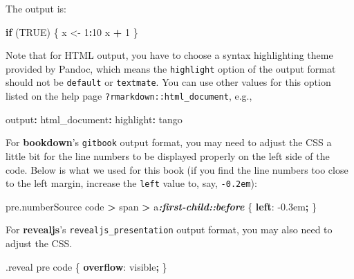 \documentclass[
  11pt,
]{krantz}
\newenvironment{Shaded}{\begin{snugshade}}{\end{snugshade}}
\newcommand{\AttributeTok}[1]{\textcolor[rgb]{0.61,0.61,0.61}{#1}}
\newcommand{\ControlFlowTok}[1]{\textcolor[rgb]{0.27,0.27,0.27}{\textbf{#1}}}
\newcommand{\DataTypeTok}[1]{\textcolor[rgb]{0.27,0.27,0.27}{#1}}
\newcommand{\DecValTok}[1]{\textcolor[rgb]{0.06,0.06,0.06}{#1}}
\newcommand{\FunctionTok}[1]{\textcolor[rgb]{0,0,0}{#1}}
\newcommand{\InformationTok}[1]{\textcolor[rgb]{0.37,0.37,0.37}{\textbf{\textit{#1}}}}
\newcommand{\KeywordTok}[1]{\textcolor[rgb]{0.27,0.27,0.27}{\textbf{#1}}}
\newcommand{\NormalTok}[1]{#1}
\newcommand{\OperatorTok}[1]{\textcolor[rgb]{0.43,0.43,0.43}{\textbf{#1}}}
\newcommand{\OtherTok}[1]{\textcolor[rgb]{0.37,0.37,0.37}{#1}}
\newcommand{\StringTok}[1]{\textcolor[rgb]{0.5,0.5,0.5}{#1}}
\begin{document}
The output is:

\begin{Shaded}
\begin{Highlighting}[numbers=left,,]
\ControlFlowTok{if}\NormalTok{ (}\OtherTok{TRUE}\NormalTok{) \{}
\NormalTok{  x <-}\StringTok{ }\DecValTok{1}\OperatorTok{:}\DecValTok{10}
\NormalTok{  x }\OperatorTok{+}\StringTok{ }\DecValTok{1}
\NormalTok{\}}
\end{Highlighting}
\end{Shaded}

Note that for HTML output, you have to choose a syntax highlighting theme provided by Pandoc, which means the \texttt{highlight} option of the output format should not be \texttt{default} or \texttt{textmate}. You can use other values for this option listed on the help page \texttt{?rmarkdown::html\_document}, e.g.,

\begin{Shaded}
\begin{Highlighting}[]
\FunctionTok{output}\KeywordTok{:}
\AttributeTok{  }\FunctionTok{html_document}\KeywordTok{:}
\AttributeTok{    }\FunctionTok{highlight}\KeywordTok{:}\AttributeTok{ tango}
\end{Highlighting}
\end{Shaded}

For \textbf{bookdown}'s \texttt{gitbook} output format, you may need to adjust the CSS a little bit for the line numbers to be displayed properly on the left side of the code. Below is what we used for this book (if you find the line numbers too close to the left margin, increase the \texttt{left} value to, say, \texttt{-0.2em}):

\begin{Shaded}
\begin{Highlighting}[]
\NormalTok{pre}\FunctionTok{.numberSource}\NormalTok{ code }\OperatorTok{>}\NormalTok{ span }\OperatorTok{>}\NormalTok{ a}\InformationTok{:first-child::before}\NormalTok{ \{}
  \KeywordTok{left}\NormalTok{: }\DecValTok{-0.3}\DataTypeTok{em}\OperatorTok{;}
\NormalTok{\}}
\end{Highlighting}
\end{Shaded}

For \textbf{revealjs}'s \texttt{revealjs\_presentation} output format, you may also need to adjust the CSS.

\begin{Shaded}
\begin{Highlighting}[]
\FunctionTok{.reveal}\NormalTok{ pre code \{}
  \KeywordTok{overflow}\NormalTok{: }\DecValTok{visible}\OperatorTok{;}
\NormalTok{\}}
\end{Highlighting}
\end{Shaded}
\end{document}
